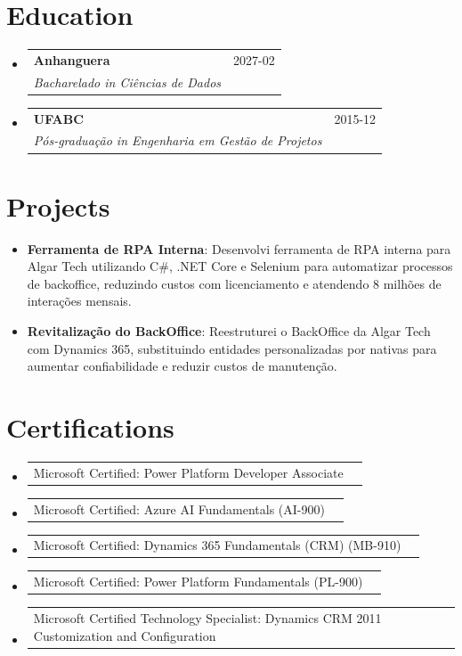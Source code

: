 \documentclass[a4paper,11pt]{article}
\makeatletter
\newcommand{\resumeItem}[1]{
  \item\small{
    {#1 \vspace{-2pt}}
  }
}
\newcommand{\resumeSubheading}[4]{
  \vspace{-1pt}\item
  \begin{tabular*}{0.97\textwidth}{l@{\extracolsep{\fill}}r}
    \textbf{#1} & #2 \\
    \textit{\small#3} & \textit{\small #4} \\
  \end{tabular*}\vspace{-5pt}
}
\newcommand{\resumeCertification}[2]{%
  \item
  \begin{tabular*}{0.97\textwidth}{@{}l@{\extracolsep{\fill}}r@{}}
    #1 & \text{#2} \\
  \end{tabular*}\vspace{-4pt}
}
\newcommand{\resumeSubItem}[2]{\resumeItem{#1: #2}\vspace{-4pt}}
\newcommand{\resumeSubHeadingListStart}{\begin{itemize}[leftmargin=0em, itemindent=0em, label={}, itemsep=0ex]}
\newcommand{\resumeSubHeadingListEnd}{\end{itemize}}
\makeatother
\begin{document}
\section{Education}
\resumeSubHeadingListStart

\resumeSubheading
{Anhanguera}{2027-02}
{Bacharelado in Ciências de Dados}{}

\resumeSubheading
{UFABC}{2015-12}
{Pós-graduação in Engenharia em Gestão de Projetos}{}
\resumeSubHeadingListEnd

\section{Projects}
\resumeSubHeadingListStart
\resumeSubItem{\textbf{Ferramenta de RPA Interna}}{Desenvolvi ferramenta de RPA interna para Algar Tech utilizando C\#, .NET Core e Selenium para automatizar processos de backoffice, reduzindo custos com licenciamento e atendendo 8 milhões de interações mensais.}
\resumeSubItem{\textbf{Revitalização do BackOffice}}{Reestruturei o BackOffice da Algar Tech com Dynamics 365, substituindo entidades personalizadas por nativas para aumentar confiabilidade e reduzir custos de manutenção.}
\resumeSubHeadingListEnd

\section{Certifications}
\resumeSubHeadingListStart
\resumeCertification{Microsoft Certified: Power Platform Developer Associate}{2025-12}{}{}
\resumeCertification{Microsoft Certified: Azure AI Fundamentals (AI-900)}{2025-12}{}{}
\resumeCertification{Microsoft Certified: Dynamics 365 Fundamentals (CRM) (MB-910)}{2023-12}{}{}
\resumeCertification{Microsoft Certified: Power Platform Fundamentals (PL-900)}{2023-12}{}{}
\resumeCertification{Microsoft Certified Technology Specialist: Dynamics CRM 2011 Customization and Configuration}{2013-12}{}{}
\resumeSubHeadingListEnd
\end{document}
